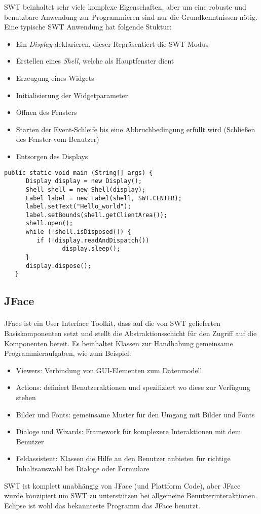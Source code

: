 SWT beinhaltet sehr viele komplexe Eigenschaften, aber um eine robuste und benutzbare Anwendung zur Programmieren sind nur die Grundkenntnissen nötig. Eine typische SWT Anwendung hat folgende Stuktur:

\begin{itemize}
\item Ein \textit{Display} deklarieren, dieser Repräsentiert die SWT Modus
\item Erstellen eines \textit{Shell}, welche als Hauptfenster dient
\item Erzeugung eines Widgets
\item Initialisierung der Widgetparameter
\item Öffnen des Fensters
\item Starten der Event-Schleife bis eine Abbruchbedingung erfüllt wird (Schließen des Fenster vom Benutzer)
\item Entsorgen des Displays
\end{itemize}

\begin{lstlisting}[caption={Beispiel einer SWT Anwendung}, captionpos=b]
   public static void main (String[] args) {
      Display display = new Display();
      Shell shell = new Shell(display);
      Label label = new Label(shell, SWT.CENTER);
      label.setText("Hello_world");
      label.setBounds(shell.getClientArea());
      shell.open();
      while (!shell.isDisposed()) {
         if (!display.readAndDispatch())
         		display.sleep();
      }
      display.dispose();
   }
\end{lstlisting}

\subsection{JFace}
\paragraph{}
JFace ist ein User Interface Toolkit, dass auf die von SWT gelieferten Basiskomponenten setzt und stellt die Abstraktionsschicht für den Zugriff auf die Komponenten bereit. Es beinhaltet Klassen zur Handhabung gemeinsame Programmieraufgaben, wie zum Beispiel:


\begin{itemize}
\item Viewers: Verbindung von GUI-Elementen zum Datenmodell
\item Actions: definiert Benutzeraktionen und spezifiziert wo diese zur Verfügung stehen
\item Bilder und Fonts: gemeinsame Muster für den Umgang mit Bilder und Fonts
\item Dialoge und Wizards: Framework für komplexere Interaktionen mit dem Benutzer
\item Feldassistent: Klassen die Hilfe an den Benutzer anbieten für richtige Inhaltsauswahl bei Dialoge oder Formulare
\end{itemize}


SWT ist komplett unabhängig von JFace (und Plattform Code), aber JFace wurde konzipiert um SWT zu unterstützen bei allgemeine Benutzerinteraktionen. Eclipse ist wohl das bekannteste Programm das JFace benutzt.\cite{EclipseHelp}